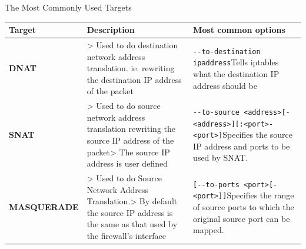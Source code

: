 \begin{frame}{The Most Commonly Used Targets}
\centering\fontsize{9.7}{11.7}\selectfont
\renewcommand{\arraystretch}{1.08}
\begin{tabular}{|Y{2.3cm}|Y{5.0cm}|Y{5.3cm}|}\hline
{}\color{white}\bfseries Target&\color{white}\bfseries Description&\color{white}\bfseries Most common options\\\hline
\textcolor{WarningColor}{\bfseries DNAT}&\textgreater{} Used to do destination network address translation. ie. rewriting the destination IP address of the packet&\texttt{-{}-to-destination ipaddress}\newline Tells iptables what the destination IP address should be\\\hline
\textcolor{WarningColor}{\bfseries SNAT}&\textgreater{} Used to do source network address translation rewriting the source IP address of the packet\newline\textgreater{} The source IP address is user defined&\texttt{-{}-to-source <address>}\newline\texttt{[-<address>][:<port>-<port>]}\newline Specifies the source IP address and ports to be used by SNAT.\\\hline
\textcolor{WarningColor}{\bfseries MASQUERADE}&\textgreater{} Used to do Source Network Address Translation.\newline\textgreater{} By default the source IP address is the same as that used by the firewall's interface&\texttt{[-{}-to-ports <port>[-<port>]]}\newline Specifies the range of source ports to which the original source port can be mapped.\\\hline
\end{tabular}
\end{frame}
